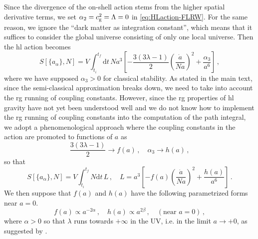 \documentclass[superscriptaddress,aps,preprintnumbers,nofootinbib]{revtex4-2}
\begin{document}
Since the divergence of the on-shell action stems from the higher spatial derivative terms, we set $\alpha_2=c_{\rm g}^2=\Lambda=0$ in \eqref{eq:HLaction-FLRW}. For the same reason, we ignore the ``dark matter as integration constant'', which means that it suffices to consider the global universe consisting of only one local universe. Then the \ac{hl} action becomes 
\begin{equation} 
        S\left[\{a_{\alpha}\},N\right] =  V\!\int_{t_i}^{t_f} \mathrm{d} t\, 
        Na^3 \left[ -\frac{3(3\lambda-1)}{2}\left(\frac{\dot{a}}{Na}\right)^{2}
              + \frac{\alpha_3}{a^6} \right]\,, 
\end{equation}
where we have supposed $\alpha_3>0$ for classical stability. As stated in the main text, since the semi-classical approximation breaks down, we need to take into account the \ac{rg} running of coupling constants. However, since the \ac{rg} properties of \ac{hl} gravity have not yet been understood well and we do not know how to implement the \ac{rg} running of coupling constants into the computation of the path integral, we adopt a phenomenological approach where the coupling constants in the action are promoted to functions of $a$ as
\begin{equation}
 \frac{3(3\lambda-1)}{2} \rightarrow f(a)\,, \quad
  \alpha_3 \rightarrow h(a)\,, 
\end{equation}
so that
\begin{equation} 
        S\left[\{a_{\alpha}\},N\right] =  V\!\int_{t_i}^{t_f} N \mathrm{d} t\, L\,, \quad 
        L = a^3 \left[ -f(a)\left(\frac{\dot{a}}{Na}\right)^{2}
             + \frac{h(a)}{a^6} \right]\,. 
\end{equation}
We then suppose that $f(a)$ and $h(a)$ have the following parametrized forms near $a=0$.
\begin{equation}
  f(a) \propto a^{-2\alpha}\,, \quad h(a) \propto a^{2\beta}\,, \quad (\mbox{near } a=0)\,,
\end{equation} 
where $\alpha>0$ so that $\lambda$ runs towards $+\infty$ in the UV, i.e. in the limit $a\to +0$, as suggested by \cite{Gumrukcuoglu:2011xg,Radkovski:2023cew}. 
\end{document}
